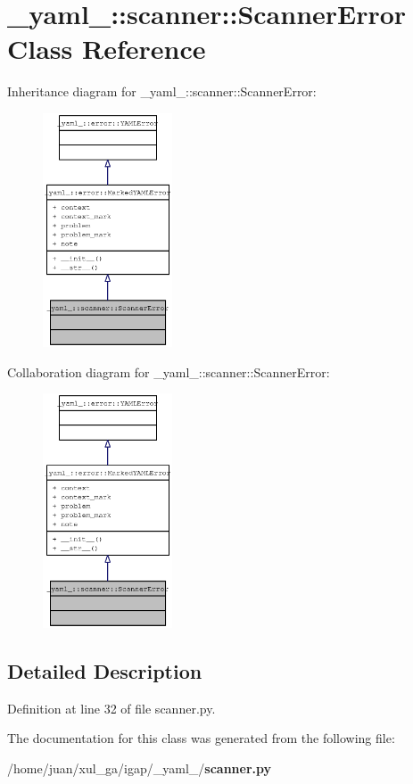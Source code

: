 \section{\_\-yaml\_\-::scanner::ScannerError Class Reference}
\label{class__yaml___1_1scanner_1_1ScannerError}
Inheritance diagram for \_\-yaml\_\-::scanner::ScannerError:\nopagebreak
\begin{figure}[H]
\begin{center}
\leavevmode
\includegraphics[width=109pt]{class__yaml___1_1scanner_1_1ScannerError__inherit__graph}
\end{center}
\end{figure}
Collaboration diagram for \_\-yaml\_\-::scanner::ScannerError:\nopagebreak
\begin{figure}[H]
\begin{center}
\leavevmode
\includegraphics[width=109pt]{class__yaml___1_1scanner_1_1ScannerError__coll__graph}
\end{center}
\end{figure}


\subsection{Detailed Description}


Definition at line 32 of file scanner.py.

The documentation for this class was generated from the following file:\begin{CompactItemize}
\item 
/home/juan/xul\_\-ga/igap/\_\-yaml\_\-/{\bf scanner.py}\end{CompactItemize}
